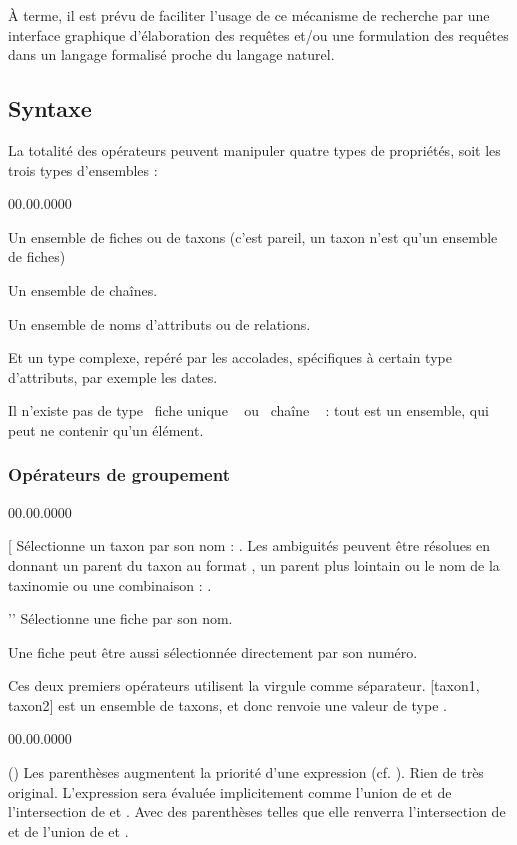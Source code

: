 \documentclass[11pt,french]{article}
\makeatletter
\providecommand{\og}{\leavevmode\flqq~}%
\providecommand{\fg}{\ifdim\lastskip>\z@\unskip\fi~\frqq}%
\makeatother
\begin{document}
À terme, il est prévu de faciliter l'usage de ce mécanisme de recherche
par une interface graphique d'élaboration des requêtes et/ou une formulation
des requêtes dans un langage formalisé proche du langage naturel.


\subsection{Syntaxe}

La totalité des opérateurs peuvent manipuler quatre types de propriétés,
soit les trois types d'ensembles :
\begin{lyxlist}{00.00.0000}
\item [{\code{set}}] Un ensemble de fiches ou de taxons (c'est pareil,
un taxon n'est qu'un ensemble de fiches)
\item [{\code{strset}}] Un ensemble de chaînes.
\item [{\code{attrset}}] Un ensemble de noms d'attributs ou de relations.
\end{lyxlist}
Et un type complexe, repéré par les accolades, spécifiques à certain
type d'attributs, par exemple les dates.

Il n'existe pas de type \og fiche unique \fg{} ou \og chaîne \fg{}
: tout est un ensemble, qui peut ne contenir qu'un élément.


\subsubsection{Opérateurs de groupement}
\begin{lyxlist}{00.00.0000}
\item [{{[}\quad{}{]}}] Sélectionne un taxon par son nom : \code{{[}str{]}}.
Les ambiguités peuvent être résolues en donnant un parent du taxon
au format , un parent plus lointain 
ou le nom de la taxinomie  ou une combinaison
: . 
\item [{'\quad{}'}] Sélectionne une fiche par son nom. 


Une fiche peut être aussi sélectionnée directement par son numéro.

\end{lyxlist}
Ces deux premiers opérateurs utilisent la virgule comme séparateur.
{[}taxon1, taxon2{]} est un ensemble de taxons, et donc renvoie une
valeur de type .
\begin{lyxlist}{00.00.0000}
\item [{()}] Les parenthèses augmentent la priorité d'une expression (cf.
). Rien de très original. L'expression
 sera évaluée implicitement comme l'union de 
et de l'intersection de  et . Avec des parenthèses
telles que  elle renverra l'intersection de 
et de l'union de  et .
\end{lyxlist}
\end{document}
